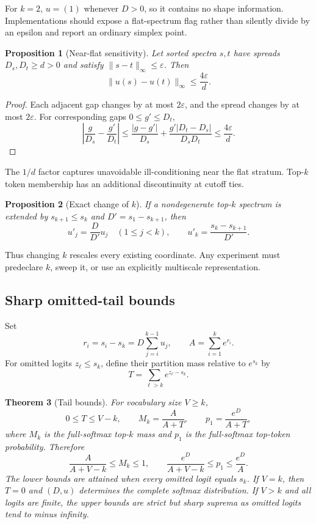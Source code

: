 \documentclass[11pt]{article}
\newtheorem{theorem}{Theorem}[section]
\newtheorem{proposition}[theorem]{Proposition}
\theoremstyle{definition}
\theoremstyle{remark}
\newcommand{\1}{\mathbf{1}}
\begin{document}
For $k=2$, $u=(1)$ whenever $D>0$, so it contains no shape information.
Implementations should expose a flat-spectrum flag rather than silently divide
by an epsilon and report an ordinary simplex point.

\begin{proposition}[Near-flat sensitivity]\label{prop:sensitivity}
Let sorted spectra $s,t$ have spreads $D_s,D_t\geq d>0$ and satisfy
$\|s-t\|_\infty\leq\varepsilon$.  Then
\[
  \|u(s)-u(t)\|_\infty\leq\frac{4\varepsilon}{d}.
\]
\end{proposition}

\begin{proof}
Each adjacent gap changes by at most $2\varepsilon$, and the spread changes by
at most $2\varepsilon$.  For corresponding gaps $0\leq g'\leq D_t$,
\[
 \left|\frac{g}{D_s}-\frac{g'}{D_t}\right|
 \leq\frac{|g-g'|}{D_s}
 +\frac{g'|D_t-D_s|}{D_sD_t}
 \leq\frac{4\varepsilon}{d}.
\]
\end{proof}

The $1/d$ factor captures unavoidable ill-conditioning near the flat stratum.
Top-$k$ token membership has an additional discontinuity at cutoff ties.

\begin{proposition}[Exact change of $k$]
If a nondegenerate top-$k$ spectrum is extended by $s_{k+1}\leq s_k$ and
$D'=s_1-s_{k+1}$, then
\[
  u'_j=\frac{D}{D'}u_j\quad(1\leq j<k),
  \qquad
  u'_k=\frac{s_k-s_{k+1}}{D'}.
\]
\end{proposition}

Thus changing $k$ rescales every existing coordinate.  Any experiment must
predeclare $k$, sweep it, or use an explicitly multiscale representation.

\subsection{Sharp omitted-tail bounds}

Set
\[
 r_i=s_i-s_k=D\sum_{j=i}^{k-1}u_j,
 \qquad
 A=\sum_{i=1}^{k}e^{r_i}.
\]
For omitted logits $z_\ell\leq s_k$, define their partition mass relative to
$e^{s_k}$ by
\[
  T=\sum_{\ell>k}e^{z_\ell-s_k}.
\]

\begin{theorem}[Tail bounds]\label{thm:tail-bounds}
For vocabulary size $V\geq k$,
\[
 0\leq T\leq V-k,
 \qquad
 M_k=\frac{A}{A+T},
 \qquad
 p_1=\frac{e^D}{A+T},
\]
where $M_k$ is the full-softmax top-$k$ mass and $p_1$ is the full-softmax
top-token probability.  Therefore
\[
 \frac{A}{A+V-k}\leq M_k\leq1,
 \qquad
 \frac{e^D}{A+V-k}\leq p_1\leq\frac{e^D}{A}.
\]
The lower bounds are attained when every omitted logit equals $s_k$.  If
$V=k$, then $T=0$ and $(D,u)$ determines the complete softmax distribution.
If $V>k$ and all logits are finite, the upper bounds are strict but sharp
suprema as omitted logits tend to minus infinity.
\end{theorem}
\end{document}
